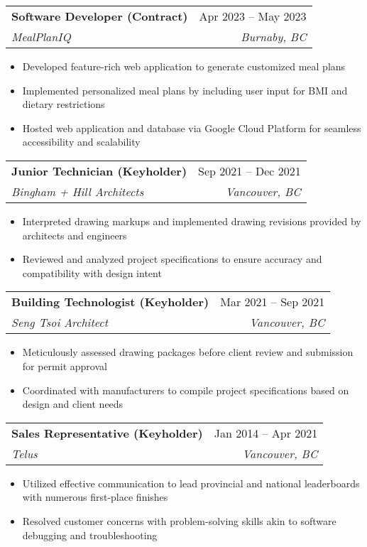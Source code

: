 \documentclass[letterpaper,11pt]{article}
\makeatletter
\newcommand{\resumeItem}[1]{
  \item\small{
    {#1 \vspace{-2pt}}
  }
}
\newcommand{\resumeSubheading}[4]{
  \vspace{-2pt}\item
    \begin{tabular*}{0.97\textwidth}[t]{l@{\extracolsep{\fill}}r}
      \textbf{#1} & #2 \\
      \textit{\small#3} & \textit{\small #4} \\
    \end{tabular*}\vspace{-7pt}
}
\newcommand{\resumeSubSubheading}[2]{
    \item
    \begin{tabular*}{0.97\textwidth}{l@{\extracolsep{\fill}}r}
      \textit{\small#1} & \textit{\small #2} \\
    \end{tabular*}\vspace{-7pt}
}
\newcommand{\resumeSubHeadingListEnd}{\end{itemize}}
\newcommand{\resumeItemListStart}{\begin{itemize}}
\newcommand{\resumeItemListEnd}{\end{itemize}\vspace{-5pt}}
\makeatother
\begin{document}
\resumeSubheading
{Software Developer (Contract)}{Apr 2023 -- May 2023}
{MealPlanIQ}{Burnaby, BC}
\resumeItemListStart
\resumeItem{Developed feature-rich web application to generate customized meal plans}
\resumeItem{Implemented personalized meal plans by including user input for BMI and dietary restrictions}
\resumeItem{Hosted web application and database via Google Cloud Platform for seamless accessibility and scalability}
\resumeItemListEnd

\resumeSubheading
{Junior Technician (Keyholder)}{Sep 2021 -- Dec 2021}
{Bingham + Hill Architects}{Vancouver, BC}
\resumeItemListStart
\resumeItem{Interpreted drawing markups and implemented drawing revisions provided by architects and engineers}
\resumeItem{Reviewed and analyzed project specifications to ensure accuracy and compatibility with design intent}
\resumeItemListEnd

\resumeSubheading
{Building Technologist (Keyholder)}{Mar 2021 -- Sep 2021}
{Seng Tsoi Architect}{Vancouver, BC}
\resumeItemListStart
\resumeItem{Meticulously assessed drawing packages before client review and submission for permit approval}
\resumeItem{Coordinated with manufacturers to compile project specifications based on design and client needs}
\resumeItemListEnd

\resumeSubheading
{Sales Representative (Keyholder)}{Jan 2014 -- Apr 2021}
{Telus}{Vancouver, BC}
\resumeItemListStart
\resumeItem{Utilized effective communication to lead provincial and national leaderboards with numerous first-place finishes}
\resumeItem{Resolved customer concerns with problem-solving skills akin to software debugging and troubleshooting}
\resumeItemListEnd



\end{document}
